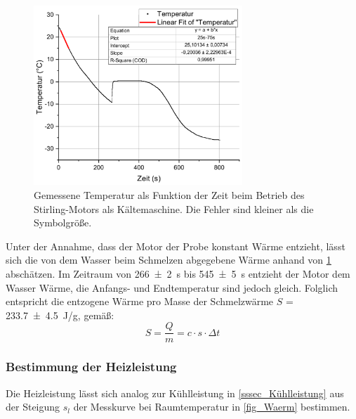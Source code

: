 \documentclass[
	a4paper,
	12pt,
	pagesize,
	ngerman
]{scrartcl}
\begin{document}
	\begin{figure}[H]
		\includegraphics[width=0.7\textwidth]{Kuehl}
		\centering
		\caption{Gemessene Temperatur als Funktion der Zeit beim Betrieb des Stirling-Motors als Kältemaschine. Die Fehler sind kleiner als die Symbolgröße.}
		\label{fig_Kuehl}
		\centering
	\end{figure}

	Unter der Annahme, dass der Motor der Probe konstant Wärme entzieht, lässt sich die von dem Wasser beim Schmelzen abgegebene Wärme anhand von \cref{fig_Kuehl} abschätzen. %
	Im Zeitraum von \SI{266+-2}{s} bis \SI{545+-5}{s} entzieht der Motor dem Wasser Wärme, die Anfangs- und Endtemperatur sind jedoch gleich. 
	Folglich entspricht die entzogene Wärme pro Masse der Schmelzwärme $S$ = \SI{233,7+-4.5}{J/g}, gemäß:
	\begin{equation}
	S = \frac{Q}{m} = c \cdot s\cdot \Delta{t}
	\end{equation}
	
	
	
	\subsubsection{Bestimmung der Heizleistung}
	Die Heizleistung lässt sich analog zur Kühlleistung in \cref{sssec_Kühlleistung} aus der Steigung $s_l$ der Messkurve bei Raumtemperatur in \cref{fig_Waerm} bestimmen. %
	
\end{document}

